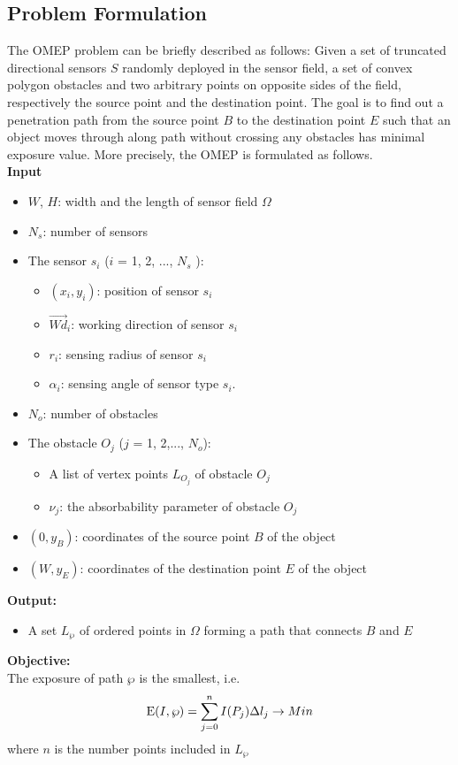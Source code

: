 \documentclass[final]{elsarticle}
\begin{document}
\subsection{Problem Formulation}
The OMEP problem can be briefly described as follows: Given a set of truncated directional sensors $S$ randomly deployed in the sensor field, a set of convex polygon obstacles and two arbitrary points on opposite sides of the field, respectively the source point and the destination point. The goal is to find out a penetration path from the source point $B$ to the destination point $E$ such that an object moves through along path without crossing any obstacles has minimal exposure value. More precisely, the OMEP is formulated as follows.\\
\textbf{Input}
\begin{itemize}
		\itemsep-0.2em
		\item $W$, $H$: width and the length of sensor field $\Omega$
		\item $N_s$: number of sensors
		\item The sensor $s_i$ ($ i $ = 1, 2, ..., $ N_s $ ):
		\begin{itemize}
			 \item $({x_i},y_i)$: position of sensor $ s_i $
			 \item $\overrightarrow{Wd}_i$: working direction of sensor $s_i$
			 \item $ r_i $: sensing radius of sensor $ s_i $
			 \item ${\alpha _i}$: sensing angle of sensor type $ s_i $.
		 \end{itemize}
		 \item $N_o$: number of obstacles
		 \item The obstacle $O_j$ ($ j $ = 1, 2,..., $N_o$): 
		 \begin{itemize}
		 	\item A list of vertex points $ L_{O_j} $ of obstacle $O_j$
		 	\item $ \nu_j $: the absorbability parameter of obstacle $O_j$
		 \end{itemize}
		\item $(0, y_B)$: coordinates of the source point $B$ of the object
		\item $(W, y_E)$: coordinates of the destination point $E$ of the object
\end{itemize}
\textbf{Output:}
\begin{itemize}
	\item A set ${L_\wp }$ of ordered points in $\Omega $ forming a path that connects $ B $ and $ E $ 
\end{itemize}
\textbf{Objective:}\\
The exposure of path  $\wp $ is the smallest, i.e.
\begin{equation}
\label{eqEmin}
{\rm E}(I,\wp ) = \sum\limits_{j = 0}^n {I(P_j)\Delta l_j}  \to Min
\end{equation}
where $ n $ is the number points included in ${L_\wp }$
\end{document}
